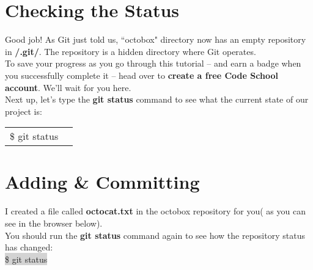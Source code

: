 \documentclass{article}
\begin{document}
\section{Checking the Status}
\begin{minipage}[c]{0.66\textwidth}
	\parbox{\textwidth}{
		Good job! As Git just told us, ``octobox" directory now has an empty repository in \textbf{/.git/}. The repository is a hidden directory where Git operates.\\
			To save your progress as you go through this tutorial -- and earn a badge when you successfully complete it -- head over to \textbf{ create a free Code School account}. We'll wait for you here.\\
			Next up, let's type the \textbf{git status} command to see what the current state of our project is:
	}
	\begin{tabular}{ll}
		\rowcolor{lightgray} \$ git status\\
	\end{tabular}

\end{minipage}%
\hfill
\begin{minipage}[c]{0.32\textwidth}
\end{minipage}

\section{Adding \& Committing}
\begin{minipage}[c]{0.66\textwidth}
	\parbox{\textwidth}{
		I created a file called \textbf{octocat.txt} in the octobox repository for you( as you can see in the browser below).\\
		  You should run the \textbf{git status} command again to see how the repository status has changed:\\
	  
	\colorbox{lightgray}{ \$ git status}\\
	}
\end{minipage}
\hfill
\begin{minipage}[c]{0.32\textwidth}
\end{minipage}
\end{document}
